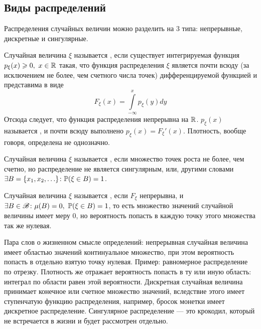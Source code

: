\documentclass[../TV&MS.tex]{subfiles}
\begin{document}
\subsection{Виды распределений}

Распределения случайных величин можно разделить на $3$ типа: непрерывные, дискретные и сингулярные.

\begin{Def}
	Случайная величина $\xi$ называется , если существует интегрируемая 
	функция $p_\xi(x) \geqslant 0, \ x \in \mathbb{R}$ такая, что функция распределения $\xi$ является почти всюду 
	(за исключением не более, чем счетного числа точек) дифференцируемой функцией и представима в виде
	$$F_\xi(x) = \int\limits_{-\infty}^x p_\xi(y)dy$$
	Отсюда следует, что функция распределения непрерывна на $\mathbb{R}$. $p_\xi(x)$ называется 
	, и почти всюду выполнено $p_\xi(x)=F_\xi'(x)$.
	Плотность, вообще говоря, определена не однозначно.
\end{Def}

\begin{Def}
	Случайная величина $\xi$ называется , если множество точек роста не более, 
	чем счетно, но распределение не является сингулярным, или, 
	другими словами $\exists B = \{x_1, x_2, \ldots\} \colon \mathbb{P}(\xi \in B) = 1$.
\end{Def}

\begin{Def}
	Случайная величина $\xi$  называется , если $F_\xi$ непрерывна, и 
	$\exists B \in \mathscr{B} \colon \mu(B) = 0, \ \mathbb{P}(\xi \in B) = 1$, то есть множество значений 
	случайной величины имеет меру 0, но вероятность попасть в каждую точку этого множества так же нулевая.
\end{Def}

Пара слов о жизненном смысле определений: непрерывная случайная величина имеет областью значений 
континуальное множество, при этом вероятность попасть в отдельно взятую точку нулевая. Пример: 
равномерное распределение по отрезку. Плотность же отражает вероятность попасть в ту или иную область: 
интеграл по области равен этой вероятности. Дискретная случайная величина принимает конечное или счетное 
множество значений, вследствие этого имеет ступенчатую функцию распределения, например, бросок монетки 
имеет дискретное распределение. Сингулярное распределение --- это крокодил, который не встречается в жизни 
и будет рассмотрен отдельно.
\end{document}
